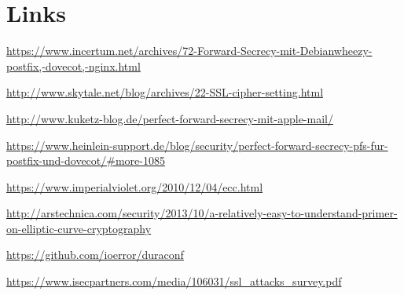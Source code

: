 \section{Links}



\url{https://www.incertum.net/archives/72-Forward-Secrecy-mit-Debianwheezy-postfix,-dovecot,-nginx.html}

\url{http://www.skytale.net/blog/archives/22-SSL-cipher-setting.html}

\url{http://www.kuketz-blog.de/perfect-forward-secrecy-mit-apple-mail/}

\url{https://www.heinlein-support.de/blog/security/perfect-forward-secrecy-pfs-fur-postfix-und-dovecot/#more-1085}

\url{https://www.imperialviolet.org/2010/12/04/ecc.html}

\url{http://arstechnica.com/security/2013/10/a-relatively-easy-to-understand-primer-on-elliptic-curve-cryptography}

\url{https://github.com/ioerror/duraconf}

\url{https://www.isecpartners.com/media/106031/ssl_attacks_survey.pdf}
